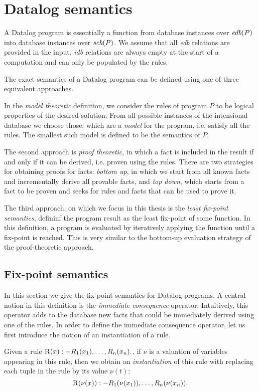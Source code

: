 \section{Datalog semantics}\label{ss:datalogsemantics}
A Datalog program is essentially a function from database instances over $\textit{edb}(P)$ into database instances over $\textit{sch}(P)$. We assume that all \emph{edb} relations are provided in the input. \emph{idb} relations are always empty at the start of a computation and can only be populated by the rules.

The exact semantics of a Datalog program can be defined using one of three  equivalent approaches.

In the \emph{model theoretic} definition, we consider the rules of program $P$ to be logical properties of the desired solution. From all possible instances of the intensional database we choose those, which are a \emph{model} for the program, i.e. satisfy all the rules. The smallest such model is defined to be the semantics of $P$.

The second approach is \emph{proof theoretic}, in which a fact is included in the result if and only if it can be derived, i.e. proven using the rules. There are two strategies for obtaining proofs for facts: \emph{bottom up}, in which we start from all known facts and incrementally derive all provable facts, and \emph{top down}, which starts from a fact to be proven and seeks for rules and facts that can be used to prove it.

The third approach, on which we focus in this thesis is the \emph{least fix-point semantics}, defininf the program result as the least fix-point of some function. In this definition, a program is evaluated by iteratively applying the function until a fix-point is reached. This is very similar to the bottom-up evaluation strategy of the proof-theoretic approach.

\subsection{Fix-point semantics}
In this section we give the fix-point semantics for Datalog programs. A central notion in this definition is the \emph{immediate consequence} operator. Intuitively, this operator adds to the database new facts that could be immediately derived using one of the rules. In order to define the immediate consequence operator, let us first introduce the notion of an instantiation of a rule.

\begin{defn}[Instantiation]
Given a rule $ \textsc{R}(x) :- R_1(x_1), \dots, R_n(x_n). $, if $\nu$ is a valuation of variables appearing in this rule, then we obtain an \emph{instantiation} of this rule with replacing each tuple in the rule by its value $\nu(t)$:
$$ \textsc{R}(\nu(x)) :- R_1(\nu(x_1)), \dots, R_n(\nu(x_n)). $$
\end{defn}

